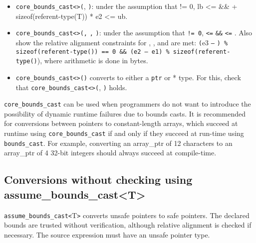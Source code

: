 \begin{itemize}
\item
  \texttt{core\_bounds\_cast\textless{}}\texttt{\textgreater{}(},
  \texttt{)}: under the assumption that  != 0, lb
  \textless{}=  \&\&  + sizeof(referent-type(T)) * e2
  \textless{}= ub.
\item
  \texttt{core\_bounds\_cast\textless{}}\texttt{\textgreater{}(}\texttt{,}
  \texttt{,} \texttt{)}: under the assumption that
   \texttt{!= 0},  \texttt{\textless{}=} 
  \texttt{\&\&}  \texttt{\textless{}=} . Also show the
  relative alignment constraints for , , and 
  are met: \texttt{(}e3 \texttt{--} \texttt{) \%
  sizeof(referent-type(}\texttt{)) == 0 \&\& (e2 -- e1) \%
  sizeof(referent-type(}\texttt{)}), where arithmetic is done in
  bytes.
\item
  \texttt{core\_bounds\_cast\textless{}}\texttt{\textgreater{}(}\texttt{)}
  converts  to either a \texttt{ptr} or * type. For this, check
  that
  \texttt{core\_bounds\_cast\textless{}}\texttt{\textgreater{}(},
  \texttt{)} holds.
\end{itemize}

\texttt{core\_bounds\_cast} can be used when programmers do not want to
introduce the possibility of dynamic runtime failures due to bounds
casts. It is recommended for conversions between pointers to
constant-length arrays, which succeed at runtime using
\texttt{core\_bounds\_cast} if and only if they succeed at run-time
using \texttt{bounds\_cast}. For example, converting an array\_ptr of 12
characters to an array\_ptr of 4 32-bit integers should always succeed
at compile-time.

\subsection{Conversions without checking using assume\_bounds\_cast\textless{}T\textgreater{}}
\label{conversions-without-checking-using-assumeux5fboundsux5fcastt}

\texttt{assume\_bounds\_cast\textless{}}T\texttt{\textgreater{}}
converts unsafe pointers to safe pointers. The declared bounds are
trusted without verification, although relative alignment is checked if
necessary. The source expression must have an unsafe pointer type.

